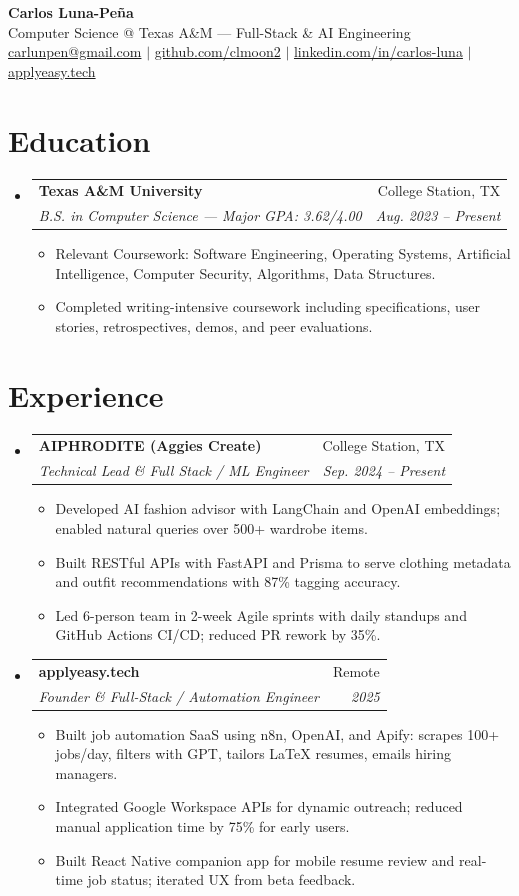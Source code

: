 \documentclass[letterpaper,11pt]{article}
\makeatletter
\newcommand{\resumeItem}[1]{
  \item\small{{#1 \vspace{-2pt}}}
}
\newcommand{\resumeSubheading}[4]{
  \vspace{-2pt}\item
    \begin{tabular*}{0.97\textwidth}[t]{l@{\extracolsep{\fill}}r}
      \textbf{#1} & #2 \\
      \textit{\small#3} & \textit{\small #4} \\
    \end{tabular*}\vspace{-7pt}
}
\newcommand{\resumeSubHeadingListStart}{\begin{itemize}[leftmargin=0.15in, label={}]}
\newcommand{\resumeSubHeadingListEnd}{\end{itemize}}
\newcommand{\resumeItemListStart}{\begin{itemize}}
\newcommand{\resumeItemListEnd}{\end{itemize}\vspace{-5pt}}
\makeatother
\begin{document}
\begin{center}
  \textbf{\Huge Carlos Luna-Pe\~na} \\ \vspace{2pt}
  Computer Science @ Texas A\&M — Full-Stack \& AI Engineering \\ \vspace{2pt}
  \href{mailto:carlunpen@gmail.com}{carlunpen@gmail.com} $|$ 
  \href{https://github.com/clmoon2}{github.com/clmoon2} $|$ 
  \href{https://linkedin.com/in/carlos-luna}{linkedin.com/in/carlos-luna} $|$ 
  \href{https://applyeasy.tech}{applyeasy.tech}
\end{center}

\section{Education}
\resumeSubHeadingListStart
  \resumeSubheading
    {Texas A\&M University}{College Station, TX}
    {B.S. in Computer Science — Major GPA: 3.62/4.00}{Aug. 2023 -- Present}
    \resumeItemListStart
      \resumeItem{Relevant Coursework: Software Engineering, Operating Systems, Artificial Intelligence, Computer Security, Algorithms, Data Structures.}
      \resumeItem{Completed writing-intensive coursework including specifications, user stories, retrospectives, demos, and peer evaluations.}
    \resumeItemListEnd
\resumeSubHeadingListEnd

\section{Experience}
\resumeSubHeadingListStart
  \resumeSubheading
    {AIPHRODITE (Aggies Create)}{College Station, TX}
    {Technical Lead \& Full Stack / ML Engineer}{Sep. 2024 -- Present}
    \resumeItemListStart
      \resumeItem{Developed AI fashion advisor with LangChain and OpenAI embeddings; enabled natural queries over 500+ wardrobe items.}
      \resumeItem{Built RESTful APIs with FastAPI and Prisma to serve clothing metadata and outfit recommendations with 87\% tagging accuracy.}
      \resumeItem{Led 6-person team in 2-week Agile sprints with daily standups and GitHub Actions CI/CD; reduced PR rework by 35\%.}
    \resumeItemListEnd

  \resumeSubheading
    {applyeasy.tech}{Remote}
    {Founder \& Full-Stack / Automation Engineer}{2025}
    \resumeItemListStart
      \resumeItem{Built job automation SaaS using n8n, OpenAI, and Apify: scrapes 100+ jobs/day, filters with GPT, tailors LaTeX resumes, emails hiring managers.}
      \resumeItem{Integrated Google Workspace APIs for dynamic outreach; reduced manual application time by 75\% for early users.}
      \resumeItem{Built React Native companion app for mobile resume review and real-time job status; iterated UX from beta feedback.}
    \resumeItemListEnd
\resumeSubHeadingListEnd
\end{document}
